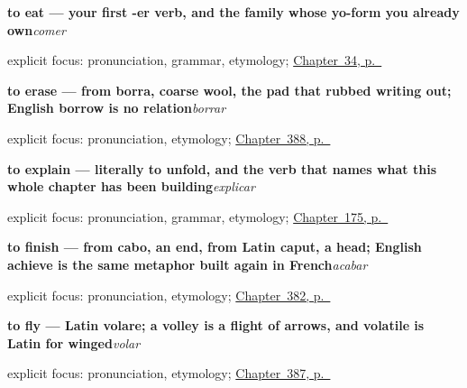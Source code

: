 \noindent\begin{minipage}[t]{\linewidth}
\raggedright
\textbf{to eat — your first -er verb, and the family whose yo-form you already own}\enspace\emph{comer}\par
\footnotesize explicit focus: pronunciation, grammar, etymology; \hyperref[ch:spanish-comer]{Chapter~34, p.~\pageref*{ch:spanish-comer}}
\end{minipage}\par\smallskip

\noindent\begin{minipage}[t]{\linewidth}
\raggedright
\textbf{to erase — from borra, coarse wool, the pad that rubbed writing out; English borrow is no relation}\enspace\emph{borrar}\par
\footnotesize explicit focus: pronunciation, etymology; \hyperref[ch:empujar-y-lanzar]{Chapter~388, p.~\pageref*{ch:empujar-y-lanzar}}
\end{minipage}\par\smallskip

\noindent\begin{minipage}[t]{\linewidth}
\raggedright
\textbf{to explain — literally to unfold, and the verb that names what this whole chapter has been building}\enspace\emph{explicar}\par
\footnotesize explicit focus: pronunciation, grammar, etymology; \hyperref[ch:spanish-giving-reasons]{Chapter~175, p.~\pageref*{ch:spanish-giving-reasons}}
\end{minipage}\par\smallskip

\noindent\begin{minipage}[t]{\linewidth}
\raggedright
\textbf{to finish — from cabo, an end, from Latin caput, a head; English achieve is the same metaphor built again in French}\enspace\emph{acabar}\par
\footnotesize explicit focus: pronunciation, etymology; \hyperref[ch:acabar-y-empezar]{Chapter~382, p.~\pageref*{ch:acabar-y-empezar}}
\end{minipage}\par\smallskip

\noindent\begin{minipage}[t]{\linewidth}
\raggedright
\textbf{to fly — Latin volare; a volley is a flight of arrows, and volatile is Latin for winged}\enspace\emph{volar}\par
\footnotesize explicit focus: pronunciation, etymology; \hyperref[ch:quemar-y-cruzar]{Chapter~387, p.~\pageref*{ch:quemar-y-cruzar}}
\end{minipage}\par\smallskip

